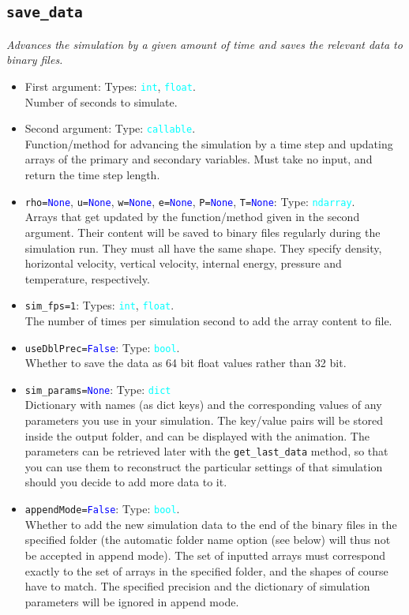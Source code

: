 \documentclass{article}
\newcommand{\ttt}[1]{\texttt{#1}}
\newcommand{\ptype}[1]{\texttt{\textcolor{cyan}{#1}}}
\newcommand{\cbl}[1]{\textcolor{blue}{#1}}
\newcommand{\cro}[1]{\textcolor{RedOrange}{#1}}
\begin{document}
\subsection{\ttt{save\_data}}
\label{sec:sd}
\textit{Advances the simulation by a given amount of time and saves the relevant data to binary files.}
\begin{itemize}
	\item First argument: Types: \ptype{int}, \ptype{float}.\\Number of seconds to simulate.
	\item Second argument: Type: \ptype{callable}.\\Function/method for advancing the simulation by a time step and updating arrays of the primary and secondary variables. Must take no input, and return the time step length.
	\item \ttt{\cro{rho}=\cbl{None}}, \ttt{\cro{u}=\cbl{None}}, \ttt{\cro{w}=\cbl{None}}, \ttt{\cro{e}=\cbl{None}}, \ttt{\cro{P}=\cbl{None}}, \ttt{\cro{T}=\cbl{None}}: Type: \ptype{ndarray}.\\Arrays that get updated by the function/method given in the second argument. Their content will be saved to binary files regularly during the simulation run. They must all have the same shape. They specify density, horizontal velocity, vertical velocity, internal energy, pressure and temperature, respectively.
	\item \ttt{\cro{sim\_fps}=1}: Types: \ptype{int}, \ptype{float}.\\The number of times per simulation second to add the array content to file.
	\item \ttt{\cro{useDblPrec}=\cbl{False}}: Type: \ptype{bool}.\\Whether to save the data as 64 bit float values rather than 32 bit.
	\item \ttt{\cro{sim\_params}=\cbl{None}}: Type: \ptype{dict}\\Dictionary with names (as dict keys) and the corresponding values of any parameters you use in your simulation. The key/value pairs will be stored inside the output folder, and can be displayed with the animation. The parameters can be retrieved later with the \ttt{get\_last\_data} method, so that you can use them to reconstruct the particular settings of that simulation should you decide to add more data to it.
	\item\ttt{\cro{appendMode}=\cbl{False}}: Type: \ptype{bool}.\\Whether to add the new simulation data to the end of the binary files in the specified folder (the automatic folder name option (see below) will thus not be accepted in append mode). The set of inputted arrays must correspond exactly to the set of arrays in the specified folder, and the shapes of course have to match. The specified precision and the dictionary of simulation parameters will be ignored in append mode.

\end{itemize}
\end{document}

